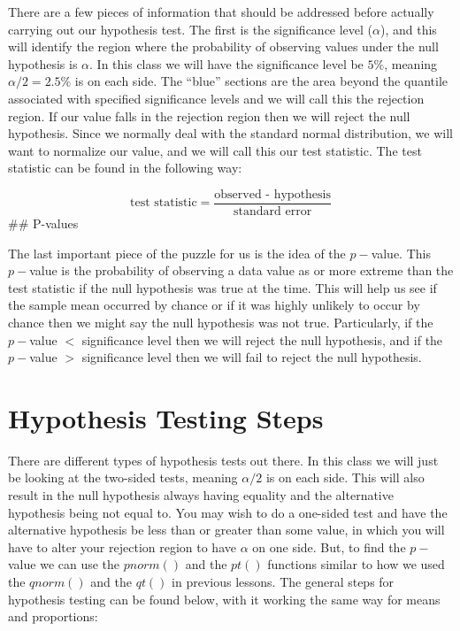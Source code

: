 \documentclass[
  letterpaper,
  DIV=11,
  numbers=noendperiod]{scrreprt}
\begin{document}
There are a few pieces of information that should be addressed before
actually carrying out our hypothesis test. The first is the significance
level (\(\alpha\)), and this will identify the region where the
probability of observing values under the null hypothesis is \(\alpha\).
In this class we will have the significance level be \(5\%\), meaning
\(\alpha/2 = 2.5\%\) is on each side. The ``blue'' sections are the area
beyond the quantile associated with specified significance levels and we
will call this the rejection region. If our value falls in the rejection
region then we will reject the null hypothesis. Since we normally deal
with the standard normal distribution, we will want to normalize our
value, and we will call this our test statistic. The test statistic can
be found in the following way:

\[ \text{test statistic} = \frac{\text{observed - hypothesis}}{\text{standard error}} \]
\#\# P-values

The last important piece of the puzzle for us is the idea of the
\(p-\)value. This \(p-\)value is the probability of observing a data
value as or more extreme than the test statistic if the null hypothesis
was true at the time. This will help us see if the sample mean occurred
by chance or if it was highly unlikely to occur by chance then we might
say the null hypothesis was not true. Particularly, if the \(p-\)value
\(<\) significance level then we will reject the null hypothesis, and if
the \(p-\)value \(>\) significance level then we will fail to reject the
null hypothesis.

\section{Hypothesis Testing Steps}\label{hypothesis-testing-steps}

There are different types of hypothesis tests out there. In this class
we will just be looking at the two-sided tests, meaning \(\alpha/2\) is
on each side. This will also result in the null hypothesis always having
equality and the alternative hypothesis being not equal to. You may wish
to do a one-sided test and have the alternative hypothesis be less than
or greater than some value, in which you will have to alter your
rejection region to have \(\alpha\) on one side. But, to find the
\(p-\)value we can use the \(pnorm()\) and the \(pt()\) functions
similar to how we used the \(qnorm()\) and the \(qt()\) in previous
lessons. The general steps for hypothesis testing can be found below,
with it working the same way for means and proportions:
\end{document}
